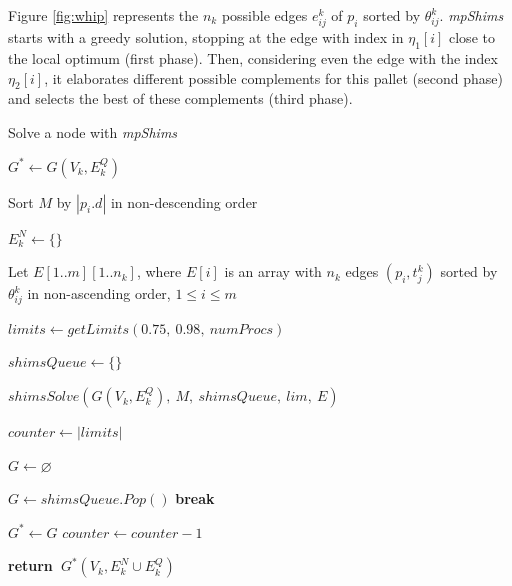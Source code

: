 \documentclass[preprint,authoryear]{elsarticle}
\newcommand{\Break}{\State \bf {break}}
\renewcommand{\Return}{\State \bf {return}~}
\begin{document}
\begin{table}[H]
\begin{minipage}{0.58\linewidth}
		\label{fig:whip}		
	\end{minipage}
\end{table}


Figure \ref{fig:whip} represents the $n_k$\/ possible edges $e_{ij}^k$\/ of $p_i$\/ sorted by $\theta_{ij}^k$. \emph{mpShims}\/ starts with a greedy solution, stopping at the edge with index in $\eta_1[i]$ close to the local optimum (first phase). Then, considering even the edge with the index $\eta_2[i]$, it elaborates different possible complements for this pallet (second phase) and selects the best of these complements (third phase).


\begin{algorithm}[H]
	\caption{Solve a node with {\it mpShims}}  \label{alg:mpshims}
	\begin{algorithmic}[1]
		
		
		\State $G^* \gets G(V_k, E^Q_k)$ \label{best_so_far}
		
		\State Sort $M$ by $|p_i.d|$ in non-descending order \label{mpshims:pallets}
		
		\State $E^N_k \gets \{\}$ \label{mpshims:items}
		
		\State Let $E[1..m][1..n_k]$, where $E[i]$ is an array with $n_k$ edges $(p_i,t^k_j)$ sorted by $\theta_{ij}^k$ in non-ascending order, $1 \leq i \leq m$ \label{mpshims:edges}
		
		\State $limits \gets getLimits(0.75,\ 0.98,\ numProcs)$ \label{mpshims:limits}
		
		\State $shimsQueue \gets \{\}$ \label{mpshims:queue}
	
			\State $shimsSolve(G(V_k, E^Q_k),\ M,\ shimsQueue,\ lim,\ E)$ \label{mpshims:send}
		\EndFor
		
		\State $counter \gets |limits|$
		
			
			\State $G \gets \varnothing$

			 
			
			\State $G \gets shimsQueue.Pop()$
					\Break
				\EndIf
			\EndWhile
			
			\If{$f_s(G) > f_s(G^*)$}
				\State $G^* \gets G$ 
			\EndIf
			\State $counter \gets counter - 1$			
		
		\EndWhile		
		
		\Return $G^*(V_k, E^N_k \cup E^Q_k)$ \label{mpshims:return}
		
		\EndProcedure
	\end{algorithmic}
\end{algorithm}
\end{document}
